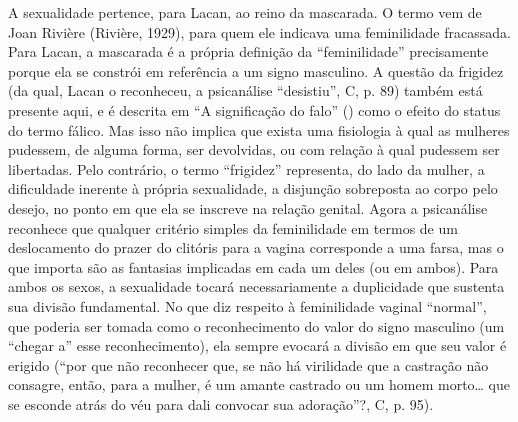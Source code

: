 A sexualidade pertence, para Lacan, ao reino da mascarada. O termo vem
de Joan Rivière (Rivière, 1929), para quem ele indicava uma feminilidade
fracassada. Para Lacan, a mascarada é a própria definição da
``feminilidade'' precisamente porque ela se constrói em referência a um
signo masculino. A questão da frigidez (da qual, Lacan o reconheceu, a
psicanálise ``desistiu'', C, p. 89) também está presente aqui, e é
descrita em ``A significação do falo'' () como o efeito do status do
termo fálico. Mas isso não implica que exista uma fisiologia à qual as
mulheres pudessem, de alguma forma, ser devolvidas, ou com relação à
qual pudessem ser libertadas. Pelo contrário, o termo ``frigidez''
representa, do lado da mulher, a dificuldade inerente à própria
sexualidade, a disjunção sobreposta ao corpo pelo desejo, no ponto em
que ela se inscreve na relação genital. Agora a psicanálise reconhece
que qualquer critério simples da feminilidade em termos de um
deslocamento do prazer do clitóris para a vagina corresponde a uma
farsa, mas o que importa são as fantasias implicadas em cada um deles
(ou em ambos). Para ambos os sexos, a sexualidade tocará necessariamente
a duplicidade que sustenta sua divisão fundamental. No que diz respeito
à feminilidade vaginal ``normal'', que poderia ser tomada como o
reconhecimento do valor do signo masculino (um ``chegar a'' esse
reconhecimento), ela sempre evocará a divisão em que seu valor é erigido
(``por que não reconhecer que, se não há virilidade que a castração não
consagre, então, para a mulher, é um amante castrado ou um homem
morto\ldots{} que se esconde atrás do véu para dali convocar sua adoração''?,
C, p. 95).

